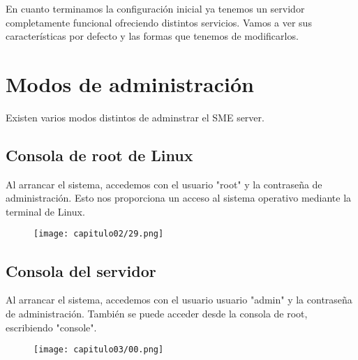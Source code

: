 
En cuanto terminamos la configuración inicial ya tenemos un servidor completamente funcional ofreciendo distintos servicios. Vamos a ver sus características por defecto y las formas que tenemos de modificarlos.

\section{Modos de administración}

Existen varios modos distintos de adminstrar el SME server.

\subsection{Consola de root de Linux}

Al arrancar el sistema, accedemos con el usuario "root" y la contraseña de administración. Esto nos proporciona un acceso al sistema operativo mediante la terminal de Linux.\\

\begin{figure}[H]
    \centering
    \texttt{[image: capitulo02/29.png]}
\end{figure}

\subsection{Consola del servidor}

Al arrancar el sistema, accedemos con el usuario usuario "admin" y la contraseña de administración. También se puede acceder desde la consola de root, escribiendo "console".\\

\begin{figure}[H]
    \centering
    \texttt{[image: capitulo03/00.png]}
\end{figure}


